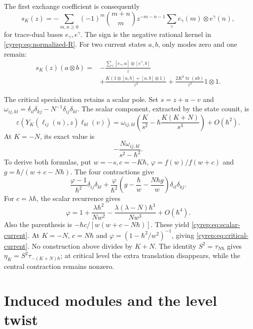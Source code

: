 The first exchange coefficient is consequently
\[
 s_K(z)=
 -\sum_{m,n\geq0}(-1)^m\binom{m+n}{m}z^{-m-n-1}
                       \sum_\gamma e_\gamma(m)\otimes e^\gamma(n),
\]
for trace-dual bases \(e_\gamma,e^\gamma\).
The sign is the negative rational kernel in
\eqref{cyrep:eq:normalized-R}.
For two current states \(a,b\), only modes zero and one remain:
\begin{equation}\label{cyrep:eq:current-exchange}
\begin{split}
 s_K(z)(a\otimes b)
 ={}&-\frac{\sum_\gamma[e_\gamma,a]\otimes[e^\gamma,b]}{z}\\
 &+\frac{K(1\otimes[a,b]+[a,b]\otimes1)}{z^2}
       +\frac{2K^2\operatorname{tr}(ab)}{z^3}1\otimes1.
\end{split}
\end{equation}

The critical specialization retains a scalar pole.
Set \(s=z+u-v\) and
\(\omega_{ij,kl}=\delta_{il}\delta_{kj}
                       -N^{-1}\delta_{ij}\delta_{kl}\).
The scalar component, extracted by the state counit, is
\begin{equation}\label{cyrep:eq:scalar-current}
 \varepsilon(Y_K(\ell_{ij}(u),z)\ell_{kl}(v))
 =\omega_{ij,kl}
       \left(\frac K{s^2}-\hbar\frac{K(K+N)}{s^3}\right)
       +O(\hbar^2).
\end{equation}
At \(K=-N\), its exact value is
\begin{equation}\label{cyrep:eq:critical-current}
 -\frac{N\omega_{ij,kl}}{s^2-\hbar^2}.
\end{equation}
To derive both formulas, put \(w=-s,c=-K\hbar\),
\(\varphi=f(w)/f(w+c)\) and \(g=\hbar/(w+c-N\hbar)\).
The four contractions give
\[
 \frac{\varphi-1}{\hbar^2}\delta_{ij}\delta_{kl}
 +\frac{\varphi}{\hbar^2}
       \left(g-\frac{\hbar}{w}-\frac{N\hbar g}{w}\right)
                            \delta_{il}\delta_{kj}.
\]
For \(c=\lambda\hbar\), the scalar recurrence gives
\[
 \varphi=1+\frac{\lambda\hbar^2}{Nw^2}
       -\frac{\lambda(\lambda-N)\hbar^3}{Nw^3}
       +O(\hbar^4).
\]
Also the parenthesis is
\(-\hbar c/[w(w+c-N\hbar)]\).
These yield \eqref{cyrep:eq:scalar-current}.
At \(K=-N\), \(c=N\hbar\) and
\(\varphi=(1-\hbar^2/w^2)^{-1}\), giving
\eqref{cyrep:eq:critical-current}.
No construction above divides by \(K+N\).
The identity \(S^2=\tau_{N\hbar}\) gives
\(\eta_K=S^2\tau_{-(K+N)\hbar}\); at critical level the
extra translation disappears, while the central contraction
remains nonzero.

\section{Induced modules and the level twist}
\label{cyrep:sec:induced}

